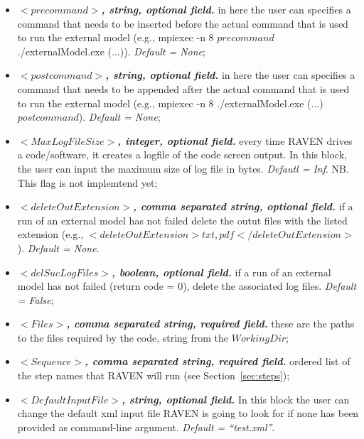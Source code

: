 \begin{itemize}
\item $<precommand>$\textbf{\textit{, string, optional field.}} in here the user can specifies a command that needs to be inserted before the actual command that is used to run the external model (e.g., mpiexec -n 8 $precommand$ ./externalModel.exe (...)). \textit{Default = None};  

\item $<postcommand>$\textbf{\textit{, string, optional field.}} in here the user can specifies a command that needs to be appended after the actual command that is used to run the external model (e.g., mpiexec -n 8  ./externalModel.exe (...) $postcommand$). \textit{Default = None};

\item $<MaxLogFileSize>$\textbf{\textit{, integer, optional field.}}  every time RAVEN drives a code/software, it creates a logfile of the code screen output. In this block, the user can input the maximum size of log file in bytes. \textit{Defautl = Inf}. NB. This flag is not implemtend yet; 

\item $<deleteOutExtension>$\textbf{\textit{, comma separated string, optional field.}} if a run of an external model has not failed delete the outut files with the listed extension (e.g., $<deleteOutExtension>txt,pdf</deleteOutExtension>$). \textit{Default = None}.

\item $<delSucLogFiles>$\textbf{\textit{, boolean, optional field.}} if a run of an external model has not failed (return code = 0), delete the associated log files. \textit{Default = False};

\item $<Files>$\textbf{\textit{, comma separated string, required field.}} these are the paths to the files required by the code, string from the $WorkingDir$; 

\item $<Sequence>$\textbf{\textit{, comma separated string, required field.}} ordered list of the step names that RAVEN will run (see Section~\ref{sec:steps});

\item $<DefaultInputFile>$\textbf{\textit{, string, optional field.}} In this block the user can change the default xml input file RAVEN is going to look for if none has been provided as command-line argument. \textit{Default = ``test.xml''}.

\end{itemize}

